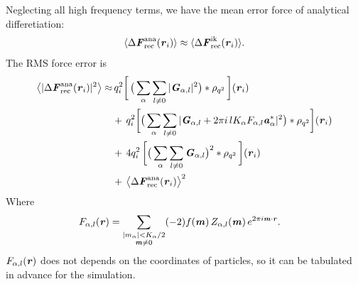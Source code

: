 \documentclass[aps,pre,preprint]{revtex4}
\renewcommand{\v}[1]{\textbf{\textit{#1}}}
\begin{document}
Neglecting all high frequency terms, we have the mean error force of
analytical differetiation:
\begin{align}\label{eqn:ana.meanf}
  \langle \Delta\v F_{\textrm{rec}}^{\textrm{ana}}(\v r_i)\rangle
  \approx
  \langle \Delta\v F_{\textrm{rec}}^{\textrm{ik}}(\v r_i)\rangle.
\end{align}
The RMS force error is 
\begin{align}\nonumber
  \big\langle
  \vert \Delta\v F_{\textrm{rec}}^{\textrm{ana}}(\v r_i)\vert^2
  \big\rangle
  \approx&\,
  q_i^2
  \bigg[\,
  \big(
  \sum_{\alpha} \sum_{l\neq 0}
  \vert \v G_{\alpha,l}\vert^2
  \big)
  \ast \rho_{q^2}
  \,\bigg] (\v r_i) \\\nonumber
  & +\,
  q_i^2
  \bigg[
  \big(
  \sum_{\alpha}\sum_{l\neq 0}
  \vert
  \v G_{\alpha,l} + 2\pi i\,l K_\alpha F_{\alpha,l} \v a_\alpha^\ast\vert^2
  \big)
  \ast \rho_{q^2}
  \bigg]
  (\v r_i) \\ \nonumber
  & +\,
  4q_i^2\,
  \bigg[
  \big(
  \sum_{\alpha} \sum_{l\neq 0}  
  \v G_{\alpha,l}
  \big)^2
  \ast \rho_{q^2}\,
  \bigg] (\v r_i) \\\label{eqn:ana.error}
  & +\,
  \big\langle \Delta\v F_{\textrm{rec}}^{\textrm{ana}}(\v r_i)\big\rangle ^2
\end{align}
Where
\begin{align}
  F_{\alpha,l} (\v r)
  &=
  \sum_{
    \begin{subarray}{c}
      \vert m_{\alpha}\vert < K_\alpha/2\\
      \v m\neq 0
    \end{subarray}}
  (-2)f(\v m)\,
  Z_{\alpha,l}(\v m)\,
  e^{2\pi i\v m\cdot \v r}.
\end{align}
$F_{\alpha,l} (\v r)$ 
does not depends on the coordinates of particles,
so it can be tabulated in advance for the simulation.
\end{document}
